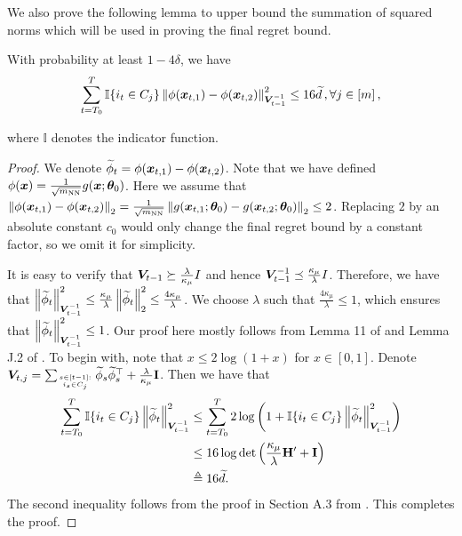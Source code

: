 We also prove the following lemma to upper bound the summation of squared norms which will be used in proving the final regret bound.
\begin{lemma}
With probability at least $1-4\delta$, we have
\label{lemma:concentration:square:std:neural}
\[
\sum^T_{t=T_0}\mathbb{I}\{i_t\in C_j\} \left\| \phi(\boldsymbol{x}_{t,1}) - \phi(\boldsymbol{x}_{t,2}) \right\|_{\boldsymbol{V}_{t-1}^{-1}}^2 \leq 16 \widetilde{d}\,, \forall j\in[m]\,,
\]
\end{lemma}
where $\mathbb{I}$ denotes the indicator function.
\begin{proof}
We denote $\widetilde{\phi}_t = \phi(\boldsymbol{x}_{t,1}) - \phi(\boldsymbol{x}_{t,2})$.
Note that we have defined $\phi(\boldsymbol{x}) = \frac{1}{\sqrt{m_{\text{NN}}}}g(\boldsymbol{x};\boldsymbol{\theta}_0)$.
Here we assume that $\left\| \phi(\boldsymbol{x}_{t,1}) - \phi(\boldsymbol{x}_{t,2}) \right\|_2 = \frac{1}{\sqrt{m_{\text{NN}}}}\left\| g(\boldsymbol{x}_{t,1};\boldsymbol{\theta}_0) - g(\boldsymbol{x}_{t,2};\boldsymbol{\theta}_0) \right\|_{2} \leq 2$.
Replacing $2$ by an absolute constant $c_0$ would only change the final regret bound by a constant factor, so we omit it for simplicity.

It is easy to verify that $\boldsymbol{V}_{t-1} \succeq \frac{\lambda}{\kappa_\mu} I$ and hence $\boldsymbol{V}_{t-1}^{-1} \preceq \frac{\kappa_\mu}{\lambda}I$.
Therefore, we have that $\left\| \widetilde{\phi}_t \right\|_{\boldsymbol{V}_{t-1}^{-1}}^2 \leq \frac{\kappa_\mu}{\lambda} \left\| \widetilde{\phi}_t \right\|_{2}^2 \leq \frac{4\kappa_\mu}{\lambda}$. We choose $\lambda$ such that $\frac{4\kappa_\mu}{\lambda} \leq 1$, which ensures that $\left\| \widetilde{\phi}_t \right\|_{\boldsymbol{V}_{t-1}^{-1}}^2 \leq 1$.
Our proof here mostly follows from Lemma 11 of \cite{abbasi2011improved} and Lemma J.2 of \cite{wang2024onlinea}. To begin with, note that $x\leq 2\log(1+x)$ for $x\in[0,1]$. Denote $\boldsymbol{V}_{t,j}=\sum_{s\in[t-1]:\atop i_s\in C_j} \widetilde{\phi}_s \widetilde{\phi}_s^\top + \frac{\lambda}{\kappa_\mu} \mathbf{I}$. Then we have that 
\begin{equation}
\begin{split}
\sum^T_{t=T_0}\mathbb{I}\{i_t\in C_j\} \left\| \widetilde{\phi}_t \right\|_{\boldsymbol{V}_{t-1}^{-1}}^2 &\leq \sum^T_{t=T_0} 2\log\left(1 + \mathbb{I}\{i_t\in C_j\} \left\| \widetilde{\phi}_t \right\|_{\boldsymbol{V}_{t-1}^{-1}}^2\right)\\
&\leq 16 \log\det\left(\frac{\kappa_\mu}{\lambda}\mathbf{H}' + \mathbf{I}\right) \\
&\triangleq 16 \widetilde{d}.
\end{split}
\end{equation}
The second inequality follows from the proof in Section A.3 from \citet{verma2024neural}.
This completes the proof.
\end{proof}



